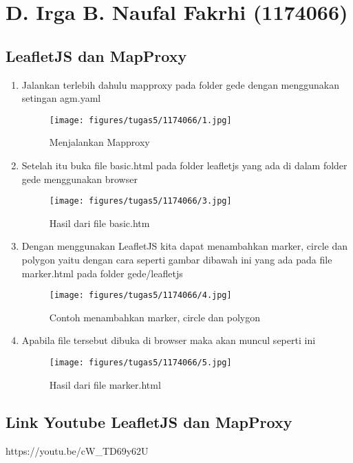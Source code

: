 \section{D. Irga B. Naufal Fakrhi (1174066)}
\subsection{LeafletJS dan MapProxy}
\begin{enumerate}
    \item Jalankan terlebih dahulu mapproxy pada folder gede dengan menggunakan setingan agm.yaml
        \hfill\break
        \begin{figure}[H]
        \texttt{[image: figures/tugas5/1174066/1.jpg]}
        \centering
        \caption{Menjalankan Mapproxy}
        \end{figure}
    \item Setelah itu buka file basic.html pada folder leafletjs yang ada di dalam folder gede menggunakan browser
        \hfill\break
        \begin{figure}[H]
        \texttt{[image: figures/tugas5/1174066/3.jpg]}
        \centering
        \caption{Hasil dari file basic.htm}
        \end{figure}
   \item Dengan menggunakan LeafletJS kita dapat menambahkan marker, circle dan polygon yaitu dengan cara seperti gambar dibawah ini yang ada pada file marker.html pada folder gede/leafletjs
        \hfill\break
        \begin{figure}[H]
        \texttt{[image: figures/tugas5/1174066/4.jpg]}
        \centering
        \caption{Contoh menambahkan marker, circle dan polygon}
        \end{figure}
   \item Apabila file tersebut dibuka di browser maka akan muncul seperti ini
        \hfill\break
        \begin{figure}[H]
        \texttt{[image: figures/tugas5/1174066/5.jpg]}
        \centering
        \caption{Hasil dari file marker.html}
        \end{figure}
\end{enumerate}
\subsection{Link Youtube LeafletJS dan MapProxy}
https://youtu.be/cW\_TD69y62U
